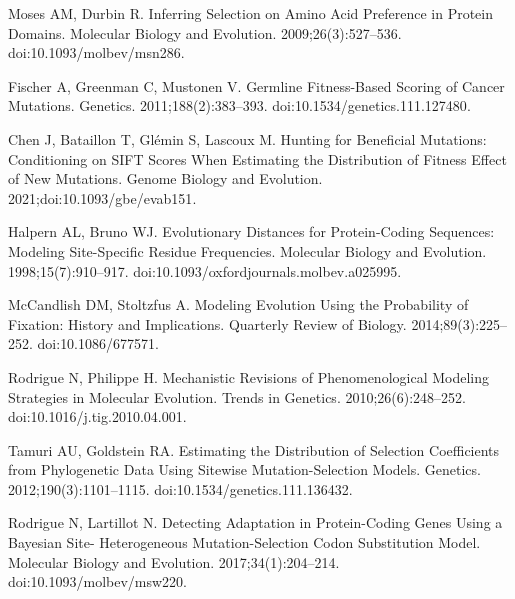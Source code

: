 \documentclass{article}
\begin{document}
\begin{thebibliography}{10}
        Moses AM, Durbin R.
        \newblock Inferring {{Selection}} on {{Amino Acid Preference}} in {{Protein
        Domains}}.
        \newblock Molecular Biology and Evolution. 2009;26(3):527--536.
        \newblock doi:{10.1093/molbev/msn286}.

        Fischer A, Greenman C, Mustonen V.
        \newblock Germline {{Fitness-Based Scoring}} of {{Cancer Mutations}}.
        \newblock Genetics. 2011;188(2):383--393.
        \newblock doi:{10.1534/genetics.111.127480}.

        Chen J, Bataillon T, Gl{\'e}min S, Lascoux M.
        \newblock Hunting for Beneficial Mutations: Conditioning on {{SIFT}} Scores
        When Estimating the Distribution of Fitness Effect of New Mutations.
        \newblock Genome Biology and Evolution. 2021;doi:{10.1093/gbe/evab151}.

        Halpern AL, Bruno WJ.
        \newblock Evolutionary Distances for Protein-Coding Sequences: Modeling
        Site-Specific Residue Frequencies.
        \newblock Molecular Biology and Evolution. 1998;15(7):910--917.
        \newblock doi:{10.1093/oxfordjournals.molbev.a025995}.

        McCandlish DM, Stoltzfus A.
        \newblock Modeling Evolution Using the Probability of Fixation: {{History}} and
        Implications.
        \newblock Quarterly Review of Biology. 2014;89(3):225--252.
        \newblock doi:{10.1086/677571}.

        Rodrigue N, Philippe H.
        \newblock Mechanistic Revisions of Phenomenological Modeling Strategies in
        Molecular Evolution.
        \newblock Trends in Genetics. 2010;26(6):248--252.
        \newblock doi:{10.1016/j.tig.2010.04.001}.

        Tamuri AU, Goldstein RA.
        \newblock Estimating the Distribution of Selection Coefficients from
        Phylogenetic Data Using Sitewise Mutation-Selection Models.
        \newblock Genetics. 2012;190(3):1101--1115.
        \newblock doi:{10.1534/genetics.111.136432}.

        Rodrigue N, Lartillot N.
        \newblock Detecting Adaptation in Protein-Coding Genes Using a {{Bayesian}}
        Site- Heterogeneous Mutation-Selection Codon Substitution Model.
        \newblock Molecular Biology and Evolution. 2017;34(1):204--214.
        \newblock doi:{10.1093/molbev/msw220}.


\end{thebibliography}
\end{document}
